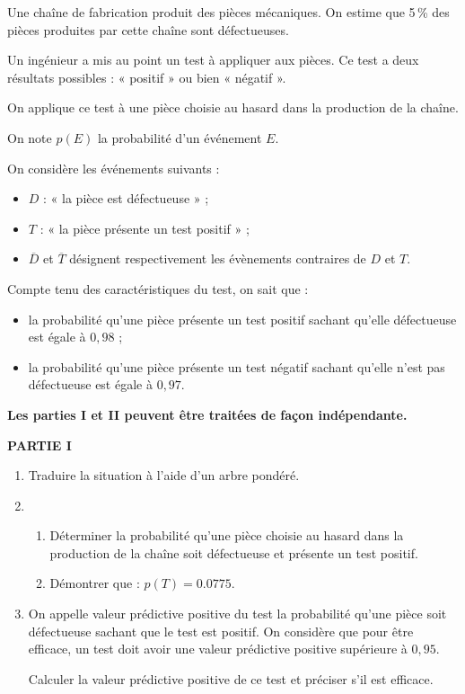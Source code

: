 Une chaîne de fabrication produit des pièces mécaniques. On estime que 5\,\% des pièces produites par cette chaîne sont défectueuses.

Un ingénieur a mis au point un test à appliquer aux pièces. Ce test a deux résultats possibles : « positif » ou bien « négatif ».

On applique ce test à une pièce choisie au hasard dans la production de la chaîne.

On note $p(E)$ la probabilité d'un événement $E$.

On considère les événements suivants :

\begin{itemize}
	\item $D$ : « la pièce est défectueuse » ;
	\item $T$ : « la pièce présente un test positif » ;
	\item $\overline{D}$ et $\overline{T}$ désignent respectivement les évènements contraires de $D$ et $T$.
\end{itemize}

Compte tenu des caractéristiques du test, on sait que :

\begin{itemize}
	\item la probabilité qu'une pièce présente un test positif sachant qu'elle défectueuse est égale à $0,98$ ;
	\item la probabilité qu'une pièce présente un test négatif sachant qu'elle n'est pas défectueuse est égale à $0,97$.
\end{itemize}

\begin{center}
	\textbf{Les parties I et II peuvent être traitées de façon indépendante.}
\end{center}

\begin{center}
	\textbf{PARTIE I}
\end{center}

\begin{enumerate}
	\item Traduire la situation à l'aide d'un arbre pondéré.
	\item 
	\begin{enumerate}
		\item Déterminer la probabilité qu'une pièce choisie au hasard dans la production de la chaîne soit défectueuse et présente un test positif.
		\item Démontrer que : $p(T) = \num{0,0775}$.
	\end{enumerate}
	\item On appelle valeur prédictive positive du test la probabilité qu'une pièce soit défectueuse sachant que le test est positif. On considère que pour être efficace, un test doit avoir une valeur prédictive positive supérieure à $0,95$.
	
	Calculer la valeur prédictive positive de ce test et préciser s'il est efficace.
\end{enumerate}

